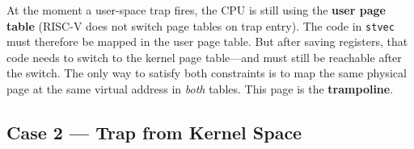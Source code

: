 \documentclass[11pt, a4paper]{article}
\begin{document}
\begin{tcolorbox}[foundational]
At the moment a user-space trap fires, the CPU is still using the \textbf{user page table} (RISC-V does not switch page tables on trap entry). The code in \lstinline|stvec| must therefore be mapped in the user page table. But after saving registers, that code needs to switch to the kernel page table---and must still be reachable after the switch. The only way to satisfy both constraints is to map the same physical page at the same virtual address in \emph{both} tables. This page is the \textbf{trampoline}.
\end{tcolorbox}

\subsection{Case 2 — Trap from Kernel Space}
\end{document}
